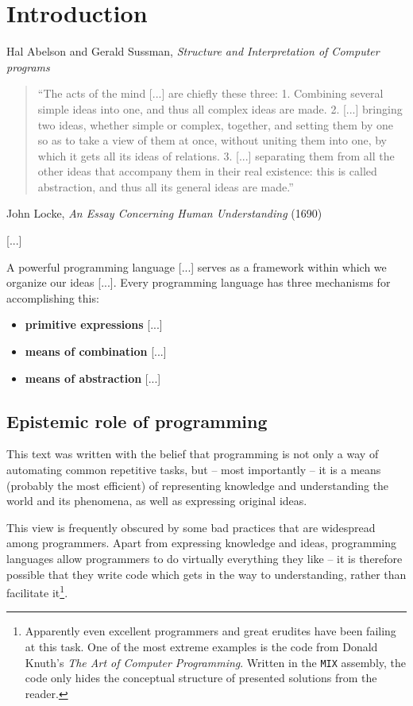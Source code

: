 \chapter{Introduction}

\begin{chapquote}{Hal Abelson and Gerald Sussman, 
\textit{Structure and Interpretation of Computer programs}}
\begin{quotation}
  ``The acts of the mind [...] are chiefly these three:
  1. Combining several simple ideas into one, and thus all complex
  ideas are made.
  2. [...] bringing two ideas, whether simple or complex, together,
  and setting them by one so as to take a view of them at once,
  without uniting them into one, by which it gets all its ideas
  of relations.
  3. [...] separating them from all the other ideas that accompany
  them in their real existence: this is called abstraction, and thus
  all its general ideas are made.''
\end{quotation}

  John Locke, \textit{An Essay Concerning Human Understanding} (1690)

  [...]

  A powerful programming language [...] serves as a framework within 
  which we organize our ideas [...]. Every programming language has
  three mechanisms for accomplishing this:
  \begin{itemize}
  \item \textbf{primitive expressions} [...]
  \item \textbf{means of combination} [...]
  \item \textbf{means of abstraction} [...]
  \end{itemize}

\end{chapquote}

\section{Epistemic role of programming}

This text was written with the belief that programming
is not only a way of automating common repetitive tasks,
but -- most importantly -- it is a means (probably the most
efficient) of representing knowledge and understanding
the world and its phenomena, as well as expressing original
ideas.

This view is frequently obscured by some bad practices
that are widespread among programmers. Apart from expressing
knowledge and ideas, programming languages allow programmers
to do virtually everything they like -- it is therefore
possible that they write code which gets in the way to
understanding, rather than facilitate it\footnote{Apparently
even excellent programmers and great erudites have been failing 
at this task. One of the most extreme examples is the code from 
Donald Knuth's \textit{The Art of Computer Programming}.
Written in the \texttt{MIX} assembly, the code only hides the
conceptual structure of presented solutions from the reader.}.

